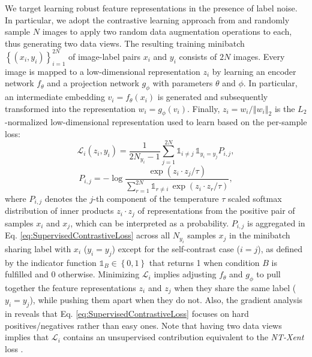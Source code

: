 \documentclass[final]{cvpr}
\begin{document}
We target learning robust feature representations in the presence of label noise. In particular, we adopt the contrastive learning approach from \cite{2020_arXiv_SupContLearn} and randomly sample $N$ images to apply two random data augmentation operations to each, thus generating two data views. The resulting training minibatch $\left\{ \left(x_{i},y_{i}\right)\right\} _{i=1}^{2N}$ of image-label pairs $x_{i}$ and $y_{i}$ consists of $2N$ images. Every image is mapped to a low-dimensional representation $z_{i}$ by learning an encoder network $f_{\theta}$ and a projection network $g_{\phi}$ with parameters $\theta$ and $\phi$. In particular, an intermediate embedding $v_{i}=f_{\theta}\left(x_{i}\right)$ is
generated and subsequently transformed into the representation $w_{i}=g_{\phi}\left(v_{i}\right)$. Finally, $z_{i}=w_{i}/\left\Vert w_{i}\right\Vert _{2}$ is the $L_2$-normalized low-dimensional representation used to learn based on the per-sample loss:
\begin{equation}
\mathcal{L}_{i}\left(z_{i},y_{i}\right)=\frac{1}{2N_{y_{i}}-1}\sum_{j=1}^{2N}\mathds{1}_{i\neq j}\,\mathds{1}_{y_{i}=y_{j}}P_{i,j},\label{eq:SupervisedContrastiveLoss}
\end{equation}
\begin{equation}
P_{i,j}=-\log\frac{\exp\left(z_{i}\cdot z_{j}/\tau\right)}{\sum_{r=1}^{2N}\mathds{1}_{r\neq i}\,\exp\left(z_{i}\cdot z_{r}/\tau\right)},
\end{equation}
where $P_{i,j}$ denotes the $j$-th component of the temperature $\tau$ scaled softmax distribution of inner products $z_{i}\cdot z_{j}$ of representations from the positive pair of samples $x_{i}$ and $x_{j}$, which can be interpreted as a probability. $P_{i,j}$ is aggregated in Eq. \ref{eq:SupervisedContrastiveLoss} across all $N_{y_{i}}$ samples $x_{j}$ in the minibatch sharing label with $x_{i}$ ($y_{i}=y_{j}$) except for the self-contrast case ($i=j$), as defined by the indicator function $\mathds{1}_{B}\in\left\{ 0,1\right\} $ that returns 1 when condition $B$ is fulfilled and 0 otherwise. Minimizing $\mathcal{L}_{i}$ implies adjusting $f_{\theta}$ and $g_{\phi}$ to pull together the feature representations $z_{i}$ and $z_{j}$ when they share the same label ($y_{i}=y_{j}$), while pushing them apart when they do not. Also, the gradient analysis in \cite{2020_arXiv_SupContLearn} reveals that Eq. \ref{eq:SupervisedContrastiveLoss} focuses on hard positives/negatives rather than easy ones. Note that having two data views implies that $\mathcal{L}_{i}$ contains an unsupervised contribution equivalent to the \emph{NT-Xent} loss \cite{2020_ICML_SimCLR}. 
\end{document}
